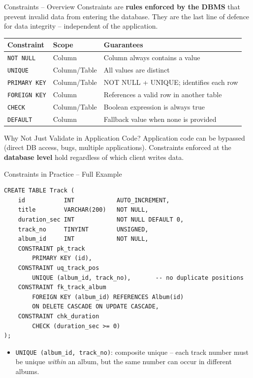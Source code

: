 \begin{frame}{Constraints -- Overview}
  Constraints are \textbf{rules enforced by the DBMS} that prevent invalid data from entering the
  database. They are the last line of defence for data integrity -- independent of the application.

  \begin{center}
  \renewcommand{\arraystretch}{1.3}
  \begin{tabular}{@{}lll@{}}
    \toprule
    \textbf{Constraint}  & \textbf{Scope}  & \textbf{Guarantees} \\
    \midrule
    \texttt{NOT NULL}    & Column & Column always contains a value \\
    \texttt{UNIQUE}      & Column/Table & All values are distinct \\
    \texttt{PRIMARY KEY} & Column/Table & NOT NULL + UNIQUE; identifies each row \\
    \texttt{FOREIGN KEY} & Column & References a valid row in another table \\
    \texttt{CHECK}       & Column/Table & Boolean expression is always true \\
    \texttt{DEFAULT}     & Column & Fallback value when none is provided \\
    \bottomrule
  \end{tabular}
  \end{center}

  \begin{block}{Why Not Just Validate in Application Code?}
    Application code can be bypassed (direct DB access, bugs, multiple applications).
    Constraints enforced at the \textbf{database level} hold regardless of which client writes data.
  \end{block}
\end{frame}

\begin{frame}[fragile]{Constraints in Practice -- Full Example}
  \begin{lstlisting}[style=sqlstyle]
CREATE TABLE Track (
    id           INT            AUTO_INCREMENT,
    title        VARCHAR(200)   NOT NULL,
    duration_sec INT            NOT NULL DEFAULT 0,
    track_no     TINYINT        UNSIGNED,
    album_id     INT            NOT NULL,
    CONSTRAINT pk_track
        PRIMARY KEY (id),
    CONSTRAINT uq_track_pos
        UNIQUE (album_id, track_no),       -- no duplicate positions
    CONSTRAINT fk_track_album
        FOREIGN KEY (album_id) REFERENCES Album(id)
        ON DELETE CASCADE ON UPDATE CASCADE,
    CONSTRAINT chk_duration
        CHECK (duration_sec >= 0)
);
  \end{lstlisting}

  \begin{itemize}
    \item \texttt{UNIQUE (album\_id, track\_no)}: composite unique -- each track number
          must be unique \emph{within} an album, but the same number can occur in different albums.
  \end{itemize}
\end{frame}

